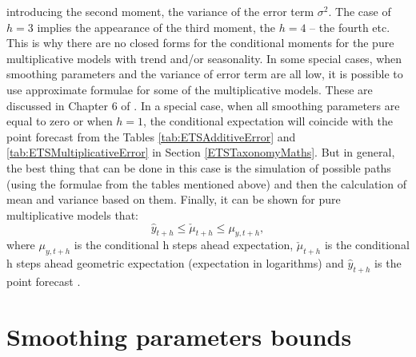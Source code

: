 \documentclass[]{book}
\theoremstyle{definition}
\theoremstyle{definition}
\theoremstyle{definition}
\theoremstyle{definition}
\theoremstyle{remark}
\begin{document}
introducing the second moment, the variance of the error term \(\sigma^2\). The case of \(h=3\) implies the appearance of the third moment, the \(h=4\) -- the fourth etc. This is why there are no closed forms for the conditional moments for the pure multiplicative models with trend and/or seasonality. In some special cases, when smoothing parameters and the variance of error term are all low, it is possible to use approximate formulae for some of the multiplicative models. These are discussed in Chapter 6 of \citet{Hyndman2008b}. In a special case, when all smoothing parameters are equal to zero or when \(h=1\), the conditional expectation will coincide with the point forecast from the Tables \ref{tab:ETSAdditiveError} and \ref{tab:ETSMultiplicativeError} in Section \ref{ETSTaxonomyMaths}. But in general, the best thing that can be done in this case is the simulation of possible paths (using the formulae from the tables mentioned above) and then the calculation of mean and variance based on them. Finally, it can be shown for pure multiplicative models that:
\begin{equation}
    \hat{y}_{t+h} \leq \check{\mu}_{t+h} \leq \mu_{y,t+h} ,
    \label{eq:ETSADAMpointValueInequality}
\end{equation}
where \(\mu_{y,t+h}\) is the conditional h steps ahead expectation, \(\check{\mu}_{t+h}\) is the conditional h steps ahead geometric expectation (expectation in logarithms) and \(\hat{y}_{t+h}\) is the point forecast \citep{Svetunkov2020ETS}.

\hypertarget{stabilityConditionMultiplicativeError}{%
\section{Smoothing parameters bounds}\label{stabilityConditionMultiplicativeError}}
\end{document}
